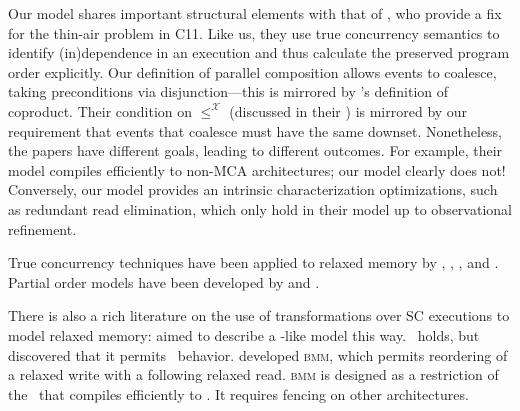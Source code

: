 Our model shares important structural elements with that of
\citet{DBLP:conf/esop/PaviottiCPWOB20}, who provide a fix for the thin-air
problem in C11.  Like us, they use true concurrency semantics to identify
(in)dependence in an execution and thus calculate the preserved program order
explicitly.  Our definition of parallel composition allows events to
coalesce, taking preconditions via disjunction---this is mirrored by
\citeauthor{DBLP:conf/esop/PaviottiCPWOB20}'s definition of coproduct.  Their
condition on $\leq^{\mathcal{X}}$ (discussed in their ) is
mirrored by our requirement that events that coalesce must have the same
downset.  Nonetheless, the papers have different goals, leading to different
outcomes.  For example, their model compiles efficiently to non-MCA
architectures; our model clearly does not!  Conversely, our model provides an
intrinsic characterization optimizations, such as redundant read elimination,
which only hold in their model up to observational refinement.




True concurrency techniques have been applied to relaxed memory by
\citet{DBLP:conf/esop/CenciarelliKS07}, \citet{Castellan},
\citet{Pichon-Pharabod:2016:CSR:2837614.2837616}, and
\citet{DBLP:conf/cgo/ChakrabortyV17}.
Partial order models have been developed by \citet{brookes} and
\citet{DBLP:journals/lmcs/KavanaghB19}.

There is also a rich literature on the use of transformations over SC
executions to model relaxed memory:
%
\citet{Saraswat:2007:TMM:1229428.1229469}
aimed to describe a \jmm-like model this way.  \drfsc\ holds, but \citet{SP} 
discovered that it permits \oota\ behavior.
%
\citet{DBLP:conf/popl/DemangeLZJPV13} developed \textsc{bmm}, which permits
reordering of a relaxed write with a following relaxed read.
\textsc{bmm} is designed as a restriction of the \jmm\ that compiles efficiently to
\tso.  It requires fencing on other architectures.

